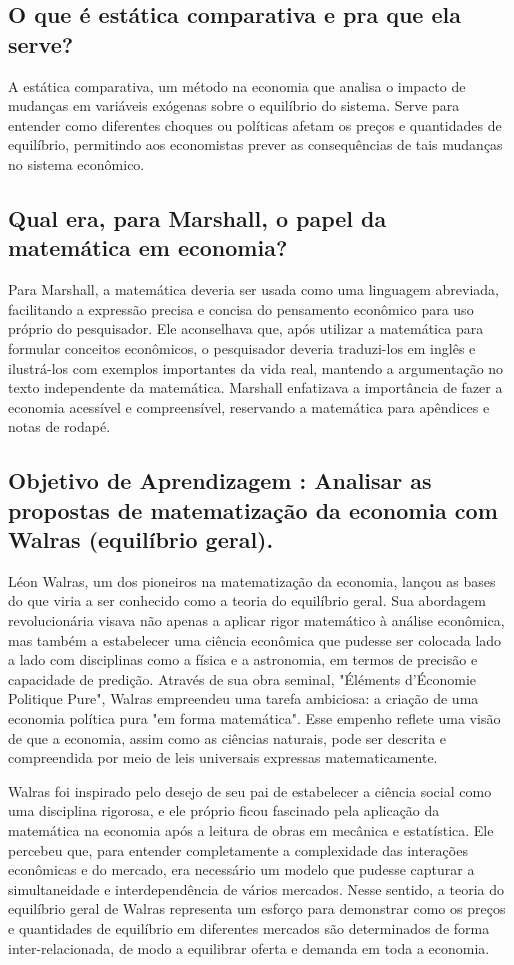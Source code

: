 \documentclass[a4paper,12pt]{article}[abntex2]
\begin{document}
\subsection{\textbf{O que é estática comparativa e pra que ela serve?}}
A estática comparativa,  um método na economia que analisa o impacto de mudanças em variáveis exógenas sobre o equilíbrio do sistema. Serve para entender como diferentes choques ou políticas afetam os preços e quantidades de equilíbrio, permitindo aos economistas prever as consequências de tais mudanças no sistema econômico.
\subsection{\textbf{Qual era, para Marshall, o papel da matemática em economia?}}
Para Marshall, a matemática deveria ser usada como uma linguagem abreviada, facilitando a expressão precisa e concisa do pensamento econômico para uso próprio do pesquisador. Ele aconselhava que, após utilizar a matemática para formular conceitos econômicos, o pesquisador deveria traduzi-los em inglês e ilustrá-los com exemplos importantes da vida real, mantendo a argumentação no texto independente da matemática. Marshall enfatizava a importância de fazer a economia acessível e compreensível, reservando a matemática para apêndices e notas de rodapé.
\subsection{\textbf{Objetivo de Aprendizagem : Analisar as propostas de matematização da economia com Walras (equilíbrio geral).}}
Léon Walras, um dos pioneiros na matematização da economia, lançou as bases do que viria a ser conhecido como a teoria do equilíbrio geral. Sua abordagem revolucionária visava não apenas a aplicar rigor matemático à análise econômica, mas também a estabelecer uma ciência econômica que pudesse ser colocada lado a lado com disciplinas como a física e a astronomia, em termos de precisão e capacidade de predição. Através de sua obra seminal, "Éléments d'Économie Politique Pure", Walras empreendeu uma tarefa ambiciosa: a criação de uma economia política pura "em forma matemática". Esse empenho reflete uma visão de que a economia, assim como as ciências naturais, pode ser descrita e compreendida por meio de leis universais expressas matematicamente.

Walras foi inspirado pelo desejo de seu pai de estabelecer a ciência social como uma disciplina rigorosa, e ele próprio ficou fascinado pela aplicação da matemática na economia após a leitura de obras em mecânica e estatística. Ele percebeu que, para entender completamente a complexidade das interações econômicas e do mercado, era necessário um modelo que pudesse capturar a simultaneidade e interdependência de vários mercados. Nesse sentido, a teoria do equilíbrio geral de Walras representa um esforço para demonstrar como os preços e quantidades de equilíbrio em diferentes mercados são determinados de forma inter-relacionada, de modo a equilibrar oferta e demanda em toda a economia.
\end{document}
